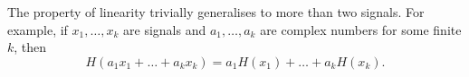 \documentclass[11pt,a4paper]{book}
\theoremstyle{plain}
\numberwithin{equation}{section}
\newcommand{\reals}{{\mathbb R}}
\begin{document}
The property of linearity trivially generalises to more than two signals.  For example, if $x_1,\dots,x_k$ are signals and $a_1,\dots,a_k$ are complex numbers for some finite $k$, then
\[
H( a_1x_1 + \dots + a_k x_k ) = a_1 H(x_1) + \dots + a_k H(x_k).
\]

\end{document}
